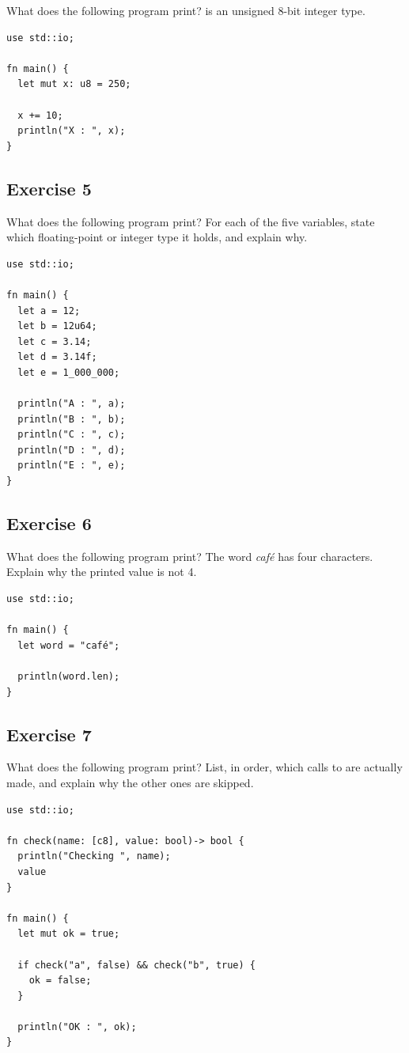 What does the following program print?  is an unsigned 8-bit
integer type.

\begin{lstlisting}[style=coloredverbatim]
use std::io;

fn main() {
  let mut x: u8 = 250;

  x += 10;
  println("X : ", x);
}
\end{lstlisting}

\subsection*{Exercise 5}

What does the following program print? For each of the five variables, state
which floating-point or integer type it holds, and explain why.

\begin{lstlisting}[style=coloredverbatim]
use std::io;

fn main() {
  let a = 12;
  let b = 12u64;
  let c = 3.14;
  let d = 3.14f;
  let e = 1_000_000;

  println("A : ", a);
  println("B : ", b);
  println("C : ", c);
  println("D : ", d);
  println("E : ", e);
}
\end{lstlisting}

\subsection*{Exercise 6}

What does the following program print? The word \textit{café} has four
characters. Explain why the printed value is not 4.

\begin{lstlisting}[style=coloredverbatim]
use std::io;

fn main() {
  let word = "café";

  println(word.len);
}
\end{lstlisting}

\subsection*{Exercise 7}

What does the following program print? List, in order, which calls to
 are actually made, and explain why the other ones are skipped.

\begin{lstlisting}[style=coloredverbatim]
use std::io;

fn check(name: [c8], value: bool)-> bool {
  println("Checking ", name);
  value
}

fn main() {
  let mut ok = true;

  if check("a", false) && check("b", true) {
    ok = false;
  }

  println("OK : ", ok);
}
\end{lstlisting}


